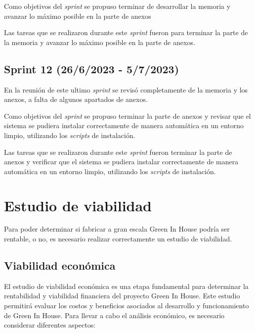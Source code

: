 Como objetivos del \textit{sprint} se propuso terminar de desarrollar la memoria y avanzar lo máximo posible en la parte de anexos

Las tareas que se realizaron durante este \textit{sprint} fueron para terminar la parte de la memoria y avanzar lo máximo posible en la parte de anexos.


\subsection{Sprint 12 (26/6/2023 - 5/7/2023)}
En la reunión de este ultimo \textit{sprint} se  revisó completamente de la memoria y los anexos, a falta de algunos apartados de anexos.

Como objetivos del \textit{sprint} se propuso terminar la parte de anexos y revisar que el sistema se pudiera instalar correctamente de manera automática en un entorno limpio, utilizando los \textit{scripts} de instalación.

Las tareas que se realizaron durante este \textit{sprint} fueron terminar la parte de anexos y verificar que el sistema se pudiera instalar correctamente de manera automática en un entorno limpio, utilizando los \textit{scripts} de instalación.


\section{Estudio de viabilidad}
Para poder determinar si fabricar a gran escala Green In House podría ser rentable, o no, es necesario realizar correctamente un estudio de viabilidad.
    \subsection{Viabilidad económica}
    El estudio de viabilidad económica es una etapa fundamental para determinar la rentabilidad y viabilidad financiera del proyecto Green In House. Este estudio permitirá evaluar los costos y beneficios asociados al desarrollo y funcionamiento de Green In House.
    Para llevar a cabo el análisis económico, es necesario considerar diferentes aspectos:
